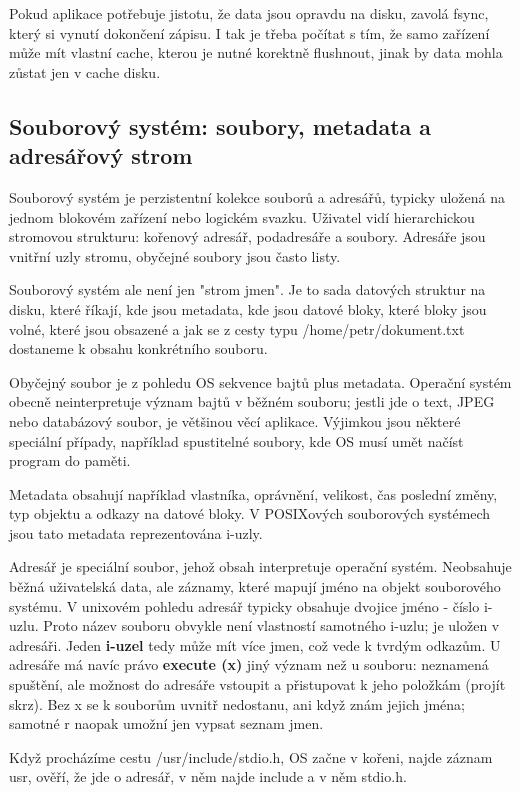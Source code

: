 Pokud aplikace potřebuje jistotu, že data jsou opravdu na disku, zavolá fsync, který si vynutí dokončení zápisu. I tak je třeba počítat s tím, že samo zařízení může mít vlastní cache, kterou je nutné korektně flushnout, jinak by data mohla zůstat jen v cache disku.

\subsection*{Souborový systém: soubory, metadata a adresářový strom}

Souborový systém je perzistentní kolekce souborů a adresářů, typicky uložená na jednom blokovém zařízení nebo logickém svazku. Uživatel vidí hierarchickou stromovou strukturu: kořenový adresář, podadresáře a soubory. Adresáře jsou vnitřní uzly stromu, obyčejné soubory jsou často listy.

Souborový systém ale není jen "strom jmen". Je to sada datových struktur na disku, které říkají, kde jsou metadata, kde jsou datové bloky, které bloky jsou volné, které jsou obsazené a jak se z cesty typu /home/petr/dokument.txt dostaneme k obsahu konkrétního souboru.

Obyčejný soubor je z pohledu OS sekvence bajtů plus metadata. Operační systém obecně neinterpretuje význam bajtů v běžném souboru; jestli jde o text, JPEG nebo databázový soubor, je většinou věcí aplikace. Výjimkou jsou některé speciální případy, například spustitelné soubory, kde OS musí umět načíst program do paměti.

Metadata obsahují například vlastníka, oprávnění, velikost, čas poslední změny, typ objektu a odkazy na datové bloky. V POSIXových souborových systémech jsou tato metadata reprezentována i-uzly.

Adresář je speciální soubor, jehož obsah interpretuje operační systém. Neobsahuje běžná uživatelská data, ale záznamy, které mapují jméno na objekt souborového systému. V unixovém pohledu adresář typicky obsahuje dvojice jméno - číslo i-uzlu. Proto název souboru obvykle není vlastností samotného i-uzlu; je uložen v adresáři. Jeden \textbf{i-uzel} tedy může mít více jmen, což vede k tvrdým odkazům. U adresáře má navíc právo \textbf{execute (x)} jiný význam než u souboru: neznamená spuštění, ale možnost do adresáře vstoupit a přistupovat k jeho položkám (projít skrz). Bez x se k souborům uvnitř nedostanu, ani když znám jejich jména; samotné r naopak umožní jen vypsat seznam jmen.

Když procházíme cestu /usr/include/stdio.h, OS začne v kořeni, najde záznam usr, ověří, že jde o adresář, v něm najde include a v něm stdio.h.


